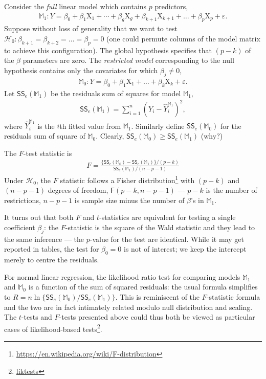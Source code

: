 \documentclass[
  11pt,
  letterpaper,
]{book}
\renewcommand{\href}[2]{#2\footnote{\url{#1}}}
\theoremstyle{definition}
\theoremstyle{definition}
\theoremstyle{definition}
\theoremstyle{definition}
\theoremstyle{remark}
\begin{document}
Consider the \emph{full} linear model which contains \(p\) predictors,
\begin{align*}
\mathbb{M}_1: Y=\beta_0+\beta_1 \mathrm{X}_1 + \cdots + \beta_g \mathrm{X}_g + \beta_{k+1}\mathrm{X}_{k+1} + \ldots + \beta_p \mathrm{X}_p + \varepsilon.
\end{align*}
Suppose without loss of generality that we want to test \(\mathscr{H}_0: \beta_{k+1}=\beta_{k+2}=\ldots=\beta_p=0\) (one could permute columns of the model matrix to achieve this configuration).
The global hypothesis specifies that \((p-k)\) of the \(\beta\) parameters are zero. The \emph{restricted model} corresponding to the null hypothesis contains only the covariates for which \(\beta_j \neq 0\),
\begin{align*}
\mathbb{M}_0: Y=\beta_0+\beta_1 \mathrm{X}_1 + \ldots + \beta_k \mathrm{X}_k + \varepsilon.
\end{align*}
Let \(\mathsf{SS}_e(\mathbb{M}_1)\) be the residuals sum of squares for model \(\mathbb{M}_1\),
\begin{align*}
\mathsf{SS}_e(\mathbb{M}_1)=\sum_{i=1}^n (Y_i-\widehat{Y}_i^{\mathbb{M}_1})^2,
\end{align*}
where \(\widehat{Y}_i^{\mathbb{M}_1}\) is the \(i\)th fitted value from \(\mathbb{M}_1\). Similarly define \(\mathsf{SS}_e(\mathbb{M}_0)\) for the residuals sum of square of \(\mathbb{M}_0\). Clearly, \(\mathsf{SS}_e(\mathbb{M}_0) \geq \mathsf{SS}_e(\mathbb{M}_1)\) (why?)

The \(F\)-test statistic is
\begin{align*}
F=\frac{\{\mathsf{SS}_e(\mathbb{M}_0)-\mathsf{SS}_e(\mathbb{M}_1)\}/(p-k)}{\mathsf{SS}_e(\mathbb{M}_1)/(n-p-1)}
\end{align*}
Under \(\mathscr{H}_0\), the \(F\) statistic follows a \href{https://en.wikipedia.org/wiki/F-distribution}{Fisher distribution} with \((p-k)\) and \((n-p-1)\) degrees of freedom, \(\mathsf{F}(p-k, n-p-1)\) --- \(p-k\) is the number of restrictions, \(n-p-1\) is sample size minus the number of \(\beta\)'s in \(\mathbb{M}_1\).

It turns out that both \(F\) and \(t\)-statistics are equivalent for testing a single coefficient \(\beta_j\): the \(F\)-statistic is the square of the Wald statistic and they lead to the same inference --- the \(p\)-value for the test are identical. While it may get reported in tables, the test for \(\beta_0=0\) is not of interest; we keep the intercept merely to centre the residuals.

For normal linear regression, the likelihood ratio test for comparing models \(\mathbb{M}_1\) and \(\mathbb{M}_0\) is a function of the sum of squared residuals: the usual formula simplifies to \(R = n\ln\{\mathsf{SS}_e(\mathbb{M}_0)/\mathsf{SS}_e(\mathbb{M}_1)\}\). This is reminiscent of the \(F\)-statistic formula and the two are in fact intimately related modulo null distribution and scaling. The \(t\)-tests and \(F\)-tests presented above could thus both be viewed as particular cases of \href{liktests}{likelihood-based tests}.
\end{document}
